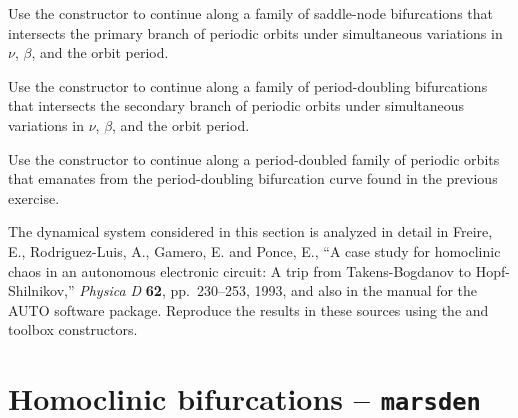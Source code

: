 \begin{exercises}
\item Use the  constructor to continue along a family of saddle-node bifurcations that intersects the primary branch of periodic orbits under simultaneous variations in $\nu$, $\beta$, and the orbit period.

\item Use the  constructor to continue along a family of period-doubling bifurcations that intersects the secondary branch of periodic orbits under simultaneous variations in $\nu$, $\beta$, and the orbit period.

\item Use the  constructor to continue along a period-doubled family of periodic orbits that emanates from the period-doubling bifurcation curve found in the previous exercise.

\item The dynamical system considered in this section is analyzed in detail in Freire, E., Rodriguez-Luis, A., Gamero, E. and Ponce, E., ``A case  study for homoclinic chaos in an autonomous electronic circuit: A trip
from Takens-Bogdanov to Hopf-Shilnikov,'' \emph{Physica D} \textbf{62}, pp.~230--253, 1993, and also in the manual for the \textsc{AUTO} software package. Reproduce the results in these sources using the  and  toolbox constructors. 
\end{exercises}

\section{Homoclinic bifurcations -- \texttt{marsden}}

